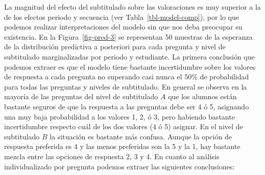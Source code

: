 \documentclass[
  12pt,
  a4paper,
  extrafontsizes,
  onecolumn,
  openright,
  table]{memoir}
\begin{document}
La magnitud del efecto del subtitulado sobre las valoraciones es muy
superior a la de los efectos periodo y secuencia (ver
Tabla~\ref{tbl-model-comp}), por lo que podemos realizar
interpretaciones del modelo sin que nos deba preocupar su existencia. En
la Figura~\ref{fig-pred-3} se representan 50 muestras de la esperanza de
la distribución predictiva a posteriori para cada pregunta y nivel de
subtitulado marginalizadas por periodo y estudiante. La primera
conclusión que podemos extraer es que el modelo tiene bastante
incertidumbre sobre los valores de respuesta a cada pregunta no
superando casi nunca el 50\% de probabilidad para todas las preguntas y
niveles de subtitulado. En general se observa en la mayoría de las
preguntas del nivel de subtitulado \(A\) que los alumnos están bastante
seguros de que la respuesta a las preguntas debe ser 4 ó 5, asignando
una muy baja probabilidad a los valores 1, 2, ó 3, pero habiendo
bastante incertidumbre respecto cuál de los dos valores (4 ó 5) asignar.
En el nivel de subtitulado \(B\) la situación es bastante más confusa.
Aunque la opción de respuesta preferida es 4 y las menos preferidas son
la 5 y la 1, hay bastante mezcla entre las opciones de respuesta 2, 3 y
4. En cuanto al análisis individualizado por pregunta podemos extraer
las siguientes conclusiones:
\end{document}
